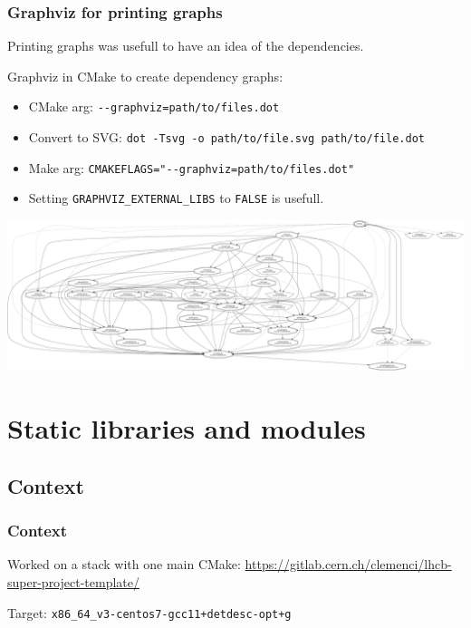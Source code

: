\documentclass{beamer}
\begin{document}
    \begin{frame}[fragile]
        \frametitle{Graphviz for printing graphs}

        Printing graphs was usefull to have an idea of the dependencies.

        Graphviz in CMake to create dependency graphs:
        \begin{itemize}
            \item CMake arg: \verb'--graphviz=path/to/files.dot'
            \item Convert to SVG: \verb'dot -Tsvg -o path/to/file.svg path/to/file.dot'
            \item Make arg: \verb'CMAKEFLAGS="--graphviz=path/to/files.dot"'
            \item Setting \verb'GRAPHVIZ_EXTERNAL_LIBS' to \verb'FALSE' is usefull.
        \end{itemize}

    \end{frame}

    \begin{frame}
        \includegraphics[width=\textwidth]{graphviz.png}
    \end{frame}

\section{Static libraries and modules}

    \subsection{Context}

    \begin{frame}[fragile]
        \frametitle{Context}

        Worked on a stack with one main CMake:
        \scriptsize \url{https://gitlab.cern.ch/clemenci/lhcb-super-project-template/} \normalsize

        Target: \verb'x86_64_v3-centos7-gcc11+detdesc-opt+g'
    \end{frame}
\end{document}
